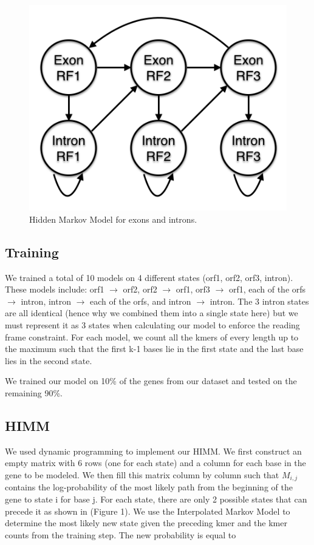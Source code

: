\documentclass[11pt,letterpaper]{article}
\begin{document}
\begin{figure}
	\begin{center}
		\includegraphics[scale=0.4]{HMM.png}
	\end{center}
	\caption{\label{font-table} Hidden Markov Model for exons and introns.}
\end{figure}

\subsection{Training}
We trained a total of 10 models on 4 different states (orf1, orf2, orf3, intron). These models include: orf1 $\rightarrow$ orf2, orf2 $\rightarrow$ orf1, orf3 $\rightarrow$ orf1, each of the orfs  $\rightarrow$  intron, intron  $\rightarrow$ each of the orfs, and intron  $\rightarrow$  intron. The 3 intron states are all identical (hence why we combined them into a single state here) but we must represent it as 3 states when calculating our model to enforce the reading frame constraint. For each model, we count all the kmers of every length up to the maximum such that the first k-1 bases lie in the first state and the last base lies in the second state.

We trained our model on 10\% of the genes from our dataset and tested on the remaining 90\%.

\subsection{HIMM}
We used dynamic programming to implement our HIMM. We first construct an empty matrix with 6 rows (one for each state) and a column for each base in the gene to be modeled. We then fill this matrix column by column such that $M_{i,j}$ contains the log-probability of the most likely path from the beginning of the gene to state i for base j. For each state, there are only 2 possible states that can precede it as shown in (Figure 1). We use the Interpolated Markov Model to determine the most likely new state given the preceding kmer and the kmer counts from the training step. The new probability is equal to
\end{document}
